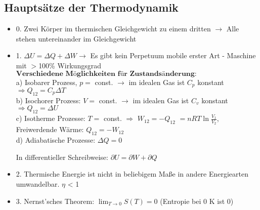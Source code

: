 \documentclass[fs, footer]{latex4ei}
\begin{document}
\begin{multicols*}{4}
\subsection{Hauptsätze der Thermodynamik}
\begin{itemize}
\item 0. Zwei Körper im thermischen Gleichgewicht zu einem dritten $\rightarrow$ Alle stehen untereinander im Gleichgewicht\\
\item 1. $\Delta U = \Delta Q + \Delta W \rightarrow $ Es gibt kein Perpetuum mobile erster Art - Maschine mit $>$100\% Wirkungsgrad\\
$\textbf{Verschiedene Möglichkeiten für Zustandsänderung:}$\\
a) Isobarer Prozess, $p =$ const. $\rightarrow$ im idealen Gas ist $C_p$ konstant $\Rightarrow Q_{12} = C_p \Delta T$\\
b) Isochorer Prozess: $V =$ const. $\rightarrow$ im idealen Gas ist $C_v$ konstant $\Rightarrow Q_{12} = \Delta U$\\
c) Isotherme Prozesse: $T =$ const. $\Rightarrow$ $W_{12} = -Q_{12}$ %
$ =n RT \ln\frac{V_1}{V_2}$, Freiwerdende Wärme: $Q_{12} = -W_{12}$\\
d) Adiabatische Prozesse: $\Delta Q = 0$

In differentieller Schreibweise: $\partial U = \partial W + \partial Q $\\
\item 2. Thermische Energie ist nicht in beliebigem Maße in andere Energiearten umwandelbar. $\eta$ < 1
\item 3. Nernst'sches Theorem: $\lim_{T \rightarrow 0} S(T) = 0$ (Entropie bei 0 K ist 0)\\
\\
\\
\end{itemize}

\end{multicols*}
\end{document}
